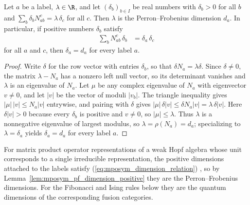 \begin{lemma}%
    \label{lem:mposym_pf_dimension_positive}
    \leanok
    Let $a$ be a label, $\lambda\in\R$, and let $(\delta_b)_{b\in I}$ be real
    numbers with $\delta_b>0$ for all $b$ and
    $\sum_b\delta_bN_{ab}^c=\lambda\,\delta_c$ for all $c$. Then $\lambda$ is
    the Perron--Frobenius dimension $d_a$. In particular, if positive numbers
    $\delta_b$ satisfy
    \begin{align}
        \sum_b N_{ab}^c\,\delta_b & =\delta_a\,\delta_c
        \label{eq:mposym_dimension_relation}
    \end{align}
    for all $a$ and $c$, then $\delta_a=d_a$ for every label $a$.
\end{lemma}

\begin{proof}
    \leanok
    Write $\delta$ for the row vector with entries $\delta_b$, so that
    $\delta N_a=\lambda\delta$. Since $\delta\neq0$, the matrix
    $\lambda-N_a$ has a nonzero left null vector, so its determinant
    vanishes and $\lambda$ is an eigenvalue of $N_a$. Let $\mu$ be any
    complex eigenvalue of $N_a$ with eigenvector $v\neq0$, and let $|v|$ be
    the vector of moduli $|v_b|$. The triangle inequality gives
    $|\mu|\,|v|\leq N_a|v|$ entrywise, and pairing with $\delta$ gives
    $|\mu|\,\delta|v|\leq\delta N_a|v|=\lambda\,\delta|v|$. Here
    $\delta|v|>0$ because every $\delta_b$ is positive and $v\neq0$, so
    $|\mu|\leq\lambda$. Thus $\lambda$ is a nonnegative eigenvalue of
    largest modulus, so $\lambda=\rho(N_a)=d_a$; specializing to
    $\lambda=\delta_a$ yields $\delta_a=d_a$ for every label $a$.
\end{proof}

For matrix product operator representations of a weak Hopf algebra whose
unit corresponds to a single irreducible representation, the positive
dimensions attached to the labels satisfy
(\ref{eq:mposym_dimension_relation})
\cite[Section~5]{Molnar2022MPOAlgebrasI}, so by
Lemma~\ref{lem:mposym_pf_dimension_positive} they are the Perron--Frobenius
dimensions. For the Fibonacci and Ising rules below they are the quantum
dimensions of the corresponding fusion categories.

